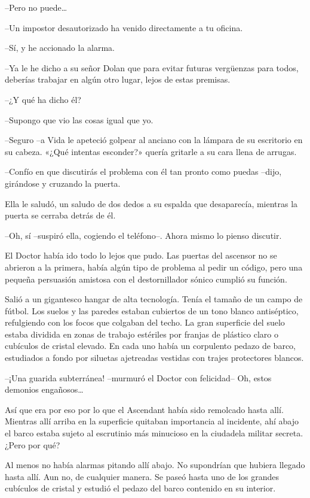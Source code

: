 {--Pero no puede\ldots{}}

{--Un impostor desautorizado ha venido directamente a tu oficina.}

{--Sí, y he accionado la alarma.}

{--Ya le he dicho a su señor Dolan que para evitar futuras vergüenzas
 para todos, deberías trabajar en algún otro lugar, lejos de estas
premisas.}

{--¿Y qué ha dicho él?}

{--Supongo que vio las cosas igual que yo.}

{--Seguro --a Vida le apeteció golpear al anciano con la lámpara de su
 escritorio en su cabeza. «¿Qué intentas esconder?» quería gritarle a su
cara llena de arrugas.}

{--Confío en que discutirás el problema con él tan pronto como puedas
--dijo, girándose y cruzando la puerta.}

{Ella le saludó, un saludo de dos dedos a su espalda que desaparecía,
mientras la puerta se cerraba detrás de él.}

{--Oh, sí --suspiró ella, cogiendo el teléfono--. Ahora mismo lo pienso
discutir.}

\mbox{}

{El Doctor había ido todo lo lejos que pudo. Las puertas del ascensor no
 se abrieron a la primera, había algún tipo de problema al pedir un
 código, pero una pequeña persuasión amistosa con el destornillador
sónico cumplió su función.}

{Salió a un gigantesco hangar de alta tecnología. Tenía el tamaño de un
 campo de fútbol. Los suelos y las paredes estaban cubiertos de un tono
 blanco antiséptico, refulgiendo con los focos que colgaban del techo. La
 gran superficie del suelo estaba dividida en zonas de trabajo estériles
 por franjas de plástico claro o cubículos de cristal elevado. En cada
 uno había un corpulento pedazo de barco, estudiados a fondo por siluetas
ajetreadas vestidas con trajes protectores blancos.}

{--¡Una guarida subterránea! --murmuró el Doctor con felicidad-- Oh,
 estos demonios engañosos\ldots{}}

{Así que era por eso por lo que el Ascendant había sido remolcado hasta
 allí. Mientras allí arriba en la superficie quitaban importancia al
 incidente, ahí abajo el barco estaba sujeto al escrutinio más minucioso
en la ciudadela militar secreta. ¿Pero por qué?}

\mbox{}

{Al menos no había alarmas pitando allí abajo. No supondrían que hubiera
 llegado hasta allí. Aun no, de cualquier manera. Se paseó hasta uno de
 los grandes cubículos de cristal y estudió el pedazo del barco contenido
en su interior.}

